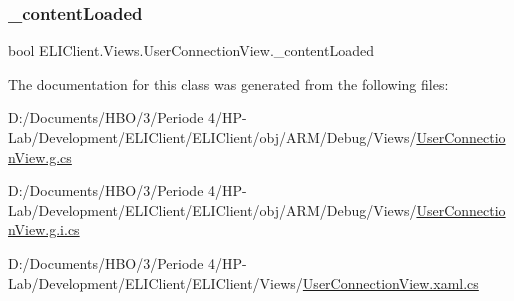 \subsubsection{\texorpdfstring{\+\_\+content\+Loaded}{\_contentLoaded}}
{\footnotesize\ttfamily bool E\+L\+I\+Client.\+Views.\+User\+Connection\+View.\+\_\+content\+Loaded\hspace{0.3cm}{\ttfamily [private]}}



The documentation for this class was generated from the following files\+:\begin{DoxyCompactItemize}
\item 
D\+:/\+Documents/\+H\+B\+O/3/\+Periode 4/\+H\+P-\/\+Lab/\+Development/\+E\+L\+I\+Client/\+E\+L\+I\+Client/obj/\+A\+R\+M/\+Debug/\+Views/\hyperlink{_a_r_m_2_debug_2_views_2_user_connection_view_8g_8cs}{User\+Connection\+View.\+g.\+cs}\item 
D\+:/\+Documents/\+H\+B\+O/3/\+Periode 4/\+H\+P-\/\+Lab/\+Development/\+E\+L\+I\+Client/\+E\+L\+I\+Client/obj/\+A\+R\+M/\+Debug/\+Views/\hyperlink{_a_r_m_2_debug_2_views_2_user_connection_view_8g_8i_8cs}{User\+Connection\+View.\+g.\+i.\+cs}\item 
D\+:/\+Documents/\+H\+B\+O/3/\+Periode 4/\+H\+P-\/\+Lab/\+Development/\+E\+L\+I\+Client/\+E\+L\+I\+Client/\+Views/\hyperlink{_user_connection_view_8xaml_8cs}{User\+Connection\+View.\+xaml.\+cs}\end{DoxyCompactItemize}
